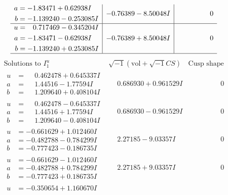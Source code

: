 \documentclass[1p]{elsarticle_modified}
\theoremstyle{definition}
\newcommand{\I}{\sqrt{-1}}
\begin{document}
$$\begin{array}{c|c|c}
\begin{aligned}
a &= -1.83471 + 0.62938 I \\
b &= -1.139240 - 0.253085 I\end{aligned}
 & -0.76389 - 8.50048 I & \phantom{-0.000000 } 0 \\ \hline\begin{aligned}
u &= \phantom{-}0.717469 - 0.345204 I \\
a &= -1.83471 - 0.62938 I \\
b &= -1.139240 + 0.253085 I\end{aligned}
 & -0.76389 + 8.50048 I & \phantom{-0.000000 } 0\\
 \hline 
 \end{array}$$\newpage$$\begin{array}{c|c|c}  
\text{Solutions to }I^u_{1}& \I (\text{vol} + \sqrt{-1}CS) & \text{Cusp shape}\\
 \hline 
\begin{aligned}
u &= \phantom{-}0.462478 + 0.645337 I \\
a &= \phantom{-}1.44516 - 1.77594 I \\
b &= \phantom{-}1.209640 + 0.408104 I\end{aligned}
 & \phantom{-}0.686930 + 0.961529 I & \phantom{-0.000000 } 0 \\ \hline\begin{aligned}
u &= \phantom{-}0.462478 - 0.645337 I \\
a &= \phantom{-}1.44516 + 1.77594 I \\
b &= \phantom{-}1.209640 - 0.408104 I\end{aligned}
 & \phantom{-}0.686930 - 0.961529 I & \phantom{-0.000000 } 0 \\ \hline\begin{aligned}
u &= -0.661629 + 1.012460 I \\
a &= -0.482788 - 0.784299 I \\
b &= -0.777423 - 0.186735 I\end{aligned}
 & \phantom{-}2.27185 - 9.03357 I & \phantom{-0.000000 } 0 \\ \hline\begin{aligned}
u &= -0.661629 - 1.012460 I \\
a &= -0.482788 + 0.784299 I \\
b &= -0.777423 + 0.186735 I\end{aligned}
 & \phantom{-}2.27185 + 9.03357 I & \phantom{-0.000000 } 0 \\ \hline\begin{aligned}
u &= -0.350654 + 1.160670 I \\

\end{aligned}
\end{array}$$
\end{document}
